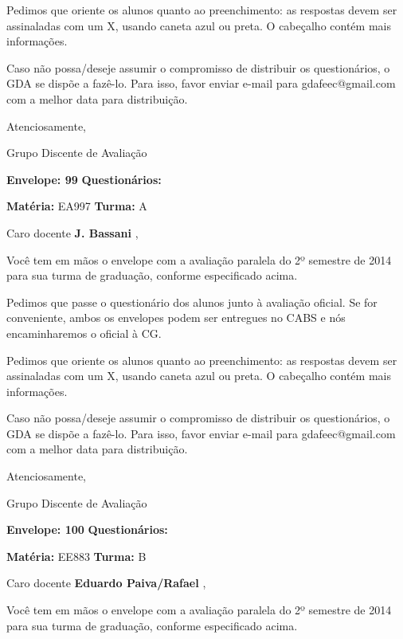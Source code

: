 \documentclass[a5paper]{letter}
\begin{document}
Pedimos que oriente os alunos quanto ao preenchimento: as respostas devem ser assinaladas com um X, usando caneta azul ou preta. O cabeçalho contém mais informações.

	Caso não possa/deseje assumir o compromisso de distribuir os questionários, o GDA se dispõe a fazê-lo. Para isso, favor enviar e-mail para gdafeec@gmail.com com a melhor data para distribuição.


Atenciosamente, 

Grupo Discente de Avaliação

\vspace{0.5cm}

{\bf Envelope: 99 }		\hfill	{\bf Questionários:} \hspace{2cm}

\newpage
\thispagestyle{empty}

\hfill {\bf Matéria:} EA997 {\bf Turma:} A

Caro docente {\bf J. Bassani }, 

	Você tem em mãos o envelope com a avaliação paralela do 2º semestre de 2014 para sua turma de graduação, conforme especificado acima.

	Pedimos que passe o questionário dos alunos junto à avaliação oficial. Se for conveniente, ambos os envelopes podem ser entregues no CABS e nós encaminharemos o oficial à CG.

Pedimos que oriente os alunos quanto ao preenchimento: as respostas devem ser assinaladas com um X, usando caneta azul ou preta. O cabeçalho contém mais informações.

	Caso não possa/deseje assumir o compromisso de distribuir os questionários, o GDA se dispõe a fazê-lo. Para isso, favor enviar e-mail para gdafeec@gmail.com com a melhor data para distribuição.


Atenciosamente, 

Grupo Discente de Avaliação

\vspace{0.5cm}

{\bf Envelope: 100 }		\hfill	{\bf Questionários:} \hspace{2cm}

\newpage
\thispagestyle{empty}

\hfill {\bf Matéria:} EE883 {\bf Turma:} B

Caro docente {\bf Eduardo Paiva/Rafael }, 

	Você tem em mãos o envelope com a avaliação paralela do 2º semestre de 2014 para sua turma de graduação, conforme especificado acima.
\end{document}
